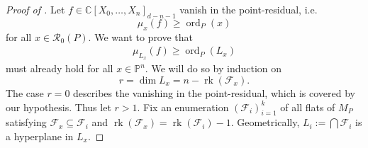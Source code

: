 \documentclass[10pt,a4paper]{amsart}
\newcommand{\C}{{\mathbb C}}
\newcommand{\cF}{{\mathcal F}}
\newcommand{\cR}{{\mathcal R}}
\newcommand{\ord}{\operatorname{ord}}
\newcommand{\pp}{\mathbb{P}}
\newcommand{\rk}{\operatorname{rk}}
\begin{document}
\begin{proof}[Proof of ]
Let $f \in \C[X_0, \dots, X_n]_{d-n-1}$ vanish in the point-residual, i.e.
\begin{equation*} \label{eq:pointresidual}
    \mu_x(f) \geq \ord_P(x)
\end{equation*}
for all $x \in \cR_0(P)$. We want to prove that \begin{align*}
    \mu_{L_x}(f)\geq \ord_P(L_x)
\end{align*}must already hold for all $x \in \pp^n$. We will do so by induction on
\begin{equation*}
    r = \dim L_x = n-\rk(\cF_x).
\end{equation*}
The case $r = 0$ describes the vanishing in the point-residual, which is covered by our hypothesis. Thus let $r > 1$. Fix an enumeration $(\cF_i)_{i=1}^k$ of all flats of $M_P$ satisfying $\cF_x \subseteq \cF_i$ and $\rk(\cF_x) = \rk(\cF_i) - 1$. Geometrically, $L_i:=\bigcap\cF_i$ is a hyperplane in $L_x$.


\end{proof}
\end{document}
